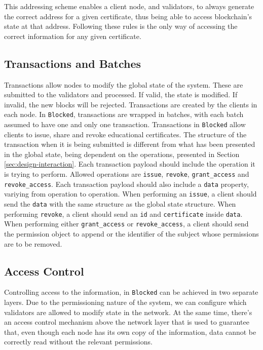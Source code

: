 This addressing scheme enables a client node, and validators, to always generate the correct address for a given certificate, thus being able to access blockchain's state at that address. Following these rules is the only way of accessing the correct information for any given certificate.

\subsection{Transactions and Batches}
\label{sec:design-transactions}

Transactions allow nodes to modify the global state of the system. These are submitted to the validators and processed. If valid, the state is modified. If invalid, the new blocks will be rejected. Transactions are created by the clients in each node. In \texttt{Blocked}, transactions are wrapped in batches, with each batch assumed to have one and only one transaction. Transactions in \texttt{Blocked} allow clients to issue, share and revoke educational certificates. The structure of the transaction when it is being submitted is different from what has been presented in the global state, being dependent on the operations, presented in Section \ref{sec:design-interaction}. Each transaction payload should include the operation it is trying to perform. Allowed operations are \texttt{issue}, \texttt{revoke}, \texttt{grant\_access} and \texttt{revoke\_access}. Each transaction payload should also include a \texttt{data} property, variying from operation to operation. When performing an \texttt{issue}, a client should send the \texttt{data} with the same structure as the global state structure. When performing \texttt{revoke}, a client should send an \texttt{id} and \texttt{certificate} inside \texttt{data}. When performing either \texttt{grant\_access} or \texttt{revoke\_access}, a client should send the permission object to append or the identifier of the subject whose permissions are to be removed.

\subsection{Access Control}
\label{sec:design-ac}

Controlling access to the information, in \texttt{Blocked} can be achieved in two separate layers. Due to the permissioning nature of the system, we can configure which validators are allowed to modify state in the network. At the same time, there's an access control mechanism above the network layer that is used to guarantee that, even though each node has its own copy of the information, data cannot be correctly read without the relevant permissions.

